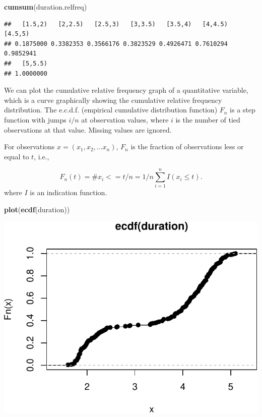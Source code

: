 \documentclass[]{article}
\newenvironment{Shaded}{\begin{snugshade}}{\end{snugshade}}
\newcommand{\KeywordTok}[1]{\textcolor[rgb]{0.13,0.29,0.53}{\textbf{{#1}}}}
\newcommand{\NormalTok}[1]{{#1}}
\numberwithin{equation}{section}
\begin{document}
\begin{Shaded}
\begin{Highlighting}[]
\KeywordTok{cumsum}\NormalTok{(duration.relfreq)}
\end{Highlighting}
\end{Shaded}

\begin{verbatim}
##   [1.5,2)   [2,2.5)   [2.5,3)   [3,3.5)   [3.5,4)   [4,4.5)   [4.5,5) 
## 0.1875000 0.3382353 0.3566176 0.3823529 0.4926471 0.7610294 0.9852941 
##   [5,5.5) 
## 1.0000000
\end{verbatim}

We can plot the cumulative relative frequency graph of a quantitative
variable, which is a curve graphically showing the cumulative relative
frequency distribution. The e.c.d.f. (empirical cumulative distribution
function) \(F_n\) is a step function with jumps \(i/n\) at observation
values, where \(i\) is the number of tied observations at that value.
Missing values are ignored.

For observations \(x = (x_1,x_2, ... x_n)\), \(F_n\) is the fraction of
observations less or equal to \(t\), i.e.,

\[
F_n(t) = \#{x_i <= t}/n = 1/n \sum_{i=1}^n I(x_i \leq t).
\] where \(I\) is an indication function.

\begin{Shaded}
\begin{Highlighting}[]
\KeywordTok{plot}\NormalTok{(}\KeywordTok{ecdf}\NormalTok{(duration))}
\end{Highlighting}
\end{Shaded}

\includegraphics{index_files/figure-latex/unnamed-chunk-112-1.pdf}
\end{document}

